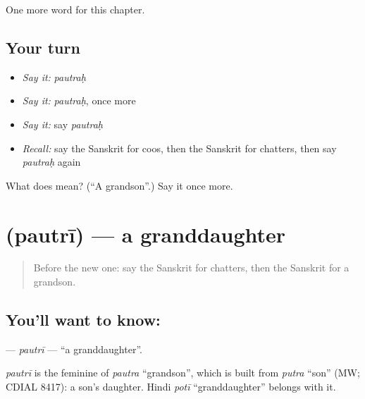 \begin{grammarlens}[title={What you've built}]
One more word for this chapter.
\end{grammarlens}

\subsection*{Your turn}
\begin{itemize}
\raggedright
  \item \emph{Say it:} \emph{pautraḥ}
  \item \emph{Say it:} \emph{pautraḥ}, once more
  \item \emph{Say it:} say \emph{pautraḥ}
  \item \emph{Recall:} say the Sanskrit for coos, then the Sanskrit for chatters, then say \emph{pautraḥ} again
\end{itemize}

\begin{tcolorbox}[breakable,colback=teal!4,colframe=teal!35!black,title={Before you move on}]
What does  mean? (\textquotedblleft{}A grandson\textquotedblright{}.) Say it once more.
\end{tcolorbox}
\section[\texorpdfstring{\sk{पौत्री} (pautrī)}{पौत्री (pautrī)}]{ (pautrī) — a granddaughter}

\label{lesson:SA-C146-pautri}



\begin{quote}
Before the new one: say the Sanskrit for chatters, then the Sanskrit for a grandson.
\end{quote}

\subsection*{You'll want to know: }
\textbf{} — \emph{pautrī} — \textquotedblleft{}a granddaughter\textquotedblright{}.

\begin{cousinweb}
\emph{pautrī} is the feminine of \emph{pautra} \textquotedblleft{}grandson\textquotedblright{}, which is built from \emph{putra} \textquotedblleft{}son\textquotedblright{} (MW; CDIAL 8417): a son's daughter. Hindi \emph{potī} \textquotedblleft{}granddaughter\textquotedblright{} belongs with it.
\end{cousinweb}

